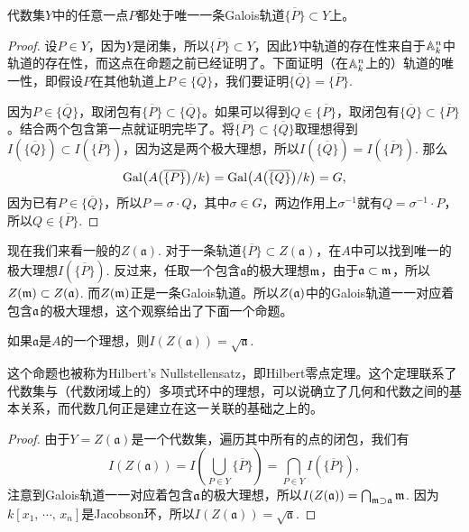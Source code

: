 \lem 代数集$Y$中的任意一点$P$都处于唯一一条Galois轨道$\overline{\{P\}}\subset Y$上。

\begin{proof} 设$P\in Y$，因为$Y$是闭集，所以$\overline{\{P\}}\subset Y$，因此$Y$中轨道的存在性来自于$\mathbb{A}^n_k$中轨道的存在性，而这点在命题之前已经证明了。下面证明（在$\mathbb{A}^n_k$上的）轨道的唯一性，即假设$P$在其他轨道上$P\in \overline{\{Q\}}$，我们要证明$\overline{\{Q\}}=\overline{\{P\}}$.

因为$P\in \overline{\{Q\}}$，取闭包有$\overline{\{P\}}\subset \overline{\{Q\}}$。如果可以得到$Q\in \overline{\{P\}}$，取闭包有$\overline{\{Q\}}\subset \overline{\{P\}}$。结合两个包含第一点就证明完毕了。将$\overline{\{P\}}\subset \overline{\{Q\}}$取理想得到$I(\overline{\{Q\}})\subset I(\overline{\{P\}})$，因为这是两个极大理想，所以$I(\overline{\{Q\}})=I(\overline{\{P\}})$. 那么
\[
	\operatorname{Gal}\bigl(A\bigl(\overline{\{P\}}\bigr)/k\bigr)=\operatorname{Gal}\bigl(A\bigl(\overline{\{Q\}}\bigr)/k\bigr)=G,
\]
因为已有$P\in \overline{\{Q\}}$，所以$P=\sigma \cdot Q$，其中$\sigma\in G$，两边作用上$\sigma^{-1}$就有$Q=\sigma^{-1}\cdot P$，所以$Q\in \overline{\{P\}}$. \end{proof}

\para 现在我们来看一般的$Z(\mathfrak{a})$. 对于一条轨道$\overline{\{P\}}\subset Z(\mathfrak{a})$，在$A$中可以找到唯一的极大理想$I(\overline{\{P\}})$. 反过来，任取一个包含$\mathfrak{a}$的极大理想$\mathfrak{m}$，由于$\mathfrak{a}\subset \mathfrak{m}$，所以$Z(\mathfrak{m})\subset Z(\mathfrak{a})$. 而$Z(\mathfrak{m})$正是一条Galois轨道。所以$Z(\mathfrak{a})$中的Galois轨道一一对应着包含$\mathfrak{a}$的极大理想，这个观察给出了下面一个命题。

\begin{pro}
如果$\mathfrak{a}$是$A$的一个理想，则$I(Z(\mathfrak{a}))=\sqrt{\mathfrak{a}}$.
\end{pro}

这个命题也被称为Hilbert's Nullstellensatz，即Hilbert零点定理。这个定理联系了代数集与（代数闭域上的）多项式环中的理想，可以说确立了几何和代数之间的基本关系，而代数几何正是建立在这一关联的基础之上的。

\begin{proof} 由于$Y=Z(\mathfrak{a})$是一个代数集，遍历其中所有的点的闭包，我们有
\[
	I(Z(\mathfrak{a}))=I\left(\bigcup_{P\in Y}\overline{\{P\}}\right)=\bigcap_{P\in Y}I\left(\overline{\{P\}}\right),
\]
注意到Galois轨道一一对应着包含$\mathfrak{a}$的极大理想，所以$I(Z(\mathfrak{a}))=\bigcap_{\mathfrak{m}\supset \mathfrak{a}}\mathfrak{m}$. 因为$k[x_1,\,\cdots\!,\,x_n]$是Jacobson环，所以$I(Z(\mathfrak{a}))=\sqrt{\mathfrak{a}}$. \end{proof}

